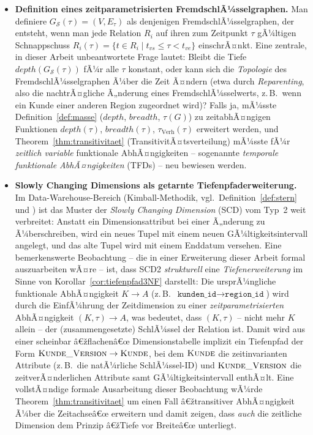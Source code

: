 ﻿\documentclass[a4paper,12pt]{report}
\theoremstyle{definition}
\theoremstyle{remark}
\newcommand{\depth}{\mathit{depth}}
\newcommand{\breadth}{\mathit{breadth}}
\begin{document}
\begin{itemize}
  \item \textbf{Definition eines zeitparametrisierten
    FremdschlÃ¼sselgraphen.} Man definiere
    $G_{\mathcal{S}}(\tau)=(V,E_\tau)$ als denjenigen
    FremdschlÃ¼sselgraphen, der entsteht, wenn man jede Relation $R_i$
    auf ihren zum Zeitpunkt $\tau$ gÃ¼ltigen Schnappschuss
    $R_i(\tau)=\{t\in R_i \mid t_{vs}\leq\tau<t_{ve}\}$ einschrÃ¤nkt.
    Eine zentrale, in dieser Arbeit unbeantwortete Frage lautet: Bleibt
    die Tiefe $\depth(G_{\mathcal{S}}(\tau))$ fÃ¼r alle $\tau$
    konstant, oder kann sich die \emph{Topologie} des
    FremdschlÃ¼sselgraphen Ã¼ber die Zeit Ã¤ndern (etwa durch
    \emph{Reparenting}, also die nachtrÃ¤gliche Ã„nderung eines
    FremdschlÃ¼sselwerts, z.\,B.\ wenn ein Kunde einer anderen Region
    zugeordnet wird)? Falls ja, mÃ¼sste Definition~\ref{def:masse}
    ($\depth$, $\breadth$, $\tau(G)$) zu zeitabhÃ¤ngigen Funktionen
    $\depth(\tau)$, $\breadth(\tau)$, $\tau_{\text{Verh}}(\tau)$
    erweitert werden, und Theorem~\ref{thm:transitivitaet}
    (TransitivitÃ¤tsverteilung) mÃ¼sste fÃ¼r \emph{zeitlich variable}
    funktionale AbhÃ¤ngigkeiten -- sogenannte \emph{temporale
    funktionale AbhÃ¤ngigkeiten} (TFDs) -- neu bewiesen werden.

  \item \textbf{Slowly Changing Dimensions als getarnte
    Tiefenpfaderweiterung.} Im Data-Warehouse-Bereich
    (Kimball-Methodik, vgl.\ Definition~\ref{def:stern} und
    \cite{Kimball1996}) ist das Muster der \emph{Slowly Changing
    Dimension} (SCD) vom Typ~2 weit verbreitet: Anstatt ein
    Dimensionsattribut bei einer Ã„nderung zu Ã¼berschreiben, wird ein
    neues Tupel mit einem neuen GÃ¼ltigkeitsintervall angelegt, und das
    alte Tupel wird mit einem Enddatum versehen. Eine bemerkenswerte
    Beobachtung -- die in einer Erweiterung dieser Arbeit formal
    auszuarbeiten wÃ¤re -- ist, dass SCD2 \emph{strukturell} eine
    \emph{Tiefenerweiterung} im Sinne von
    Korollar~\ref{cor:tiefenpfad3NF} darstellt: Die ursprÃ¼ngliche
    funktionale AbhÃ¤ngigkeit $K\to A$ (z.\,B.\
    $\texttt{kunden\_id}\to\texttt{region\_id}$) wird durch die
    EinfÃ¼hrung der Zeitdimension zu einer
    \emph{zeitparametrisierten} AbhÃ¤ngigkeit
    $(K,\tau)\to A$, was bedeutet, dass $(K,\tau)$ -- nicht mehr $K$
    allein -- der (zusammengesetzte) SchlÃ¼ssel der Relation ist. Damit
    wird aus einer scheinbar â€žflachenâ€œ Dimensionstabelle implizit ein
    Tiefenpfad der Form $\textsc{Kunde\_Version} \to \textsc{Kunde}$,
    bei dem $\textsc{Kunde}$ die zeitinvarianten Attribute (z.\,B.\
    die natÃ¼rliche SchlÃ¼ssel-ID) und $\textsc{Kunde\_Version}$ die
    zeitverÃ¤nderlichen Attribute samt GÃ¼ltigkeitsintervall enthÃ¤lt.
    Eine vollstÃ¤ndige formale Ausarbeitung dieser Beobachtung wÃ¼rde
    Theorem~\ref{thm:transitivitaet} um einen Fall â€žtransitiver
    AbhÃ¤ngigkeit Ã¼ber die Zeitachseâ€œ erweitern und damit zeigen, dass
    \emph{auch} die zeitliche Dimension dem Prinzip â€žTiefe vor Breiteâ€œ
    unterliegt.


\end{itemize}
\end{document}
